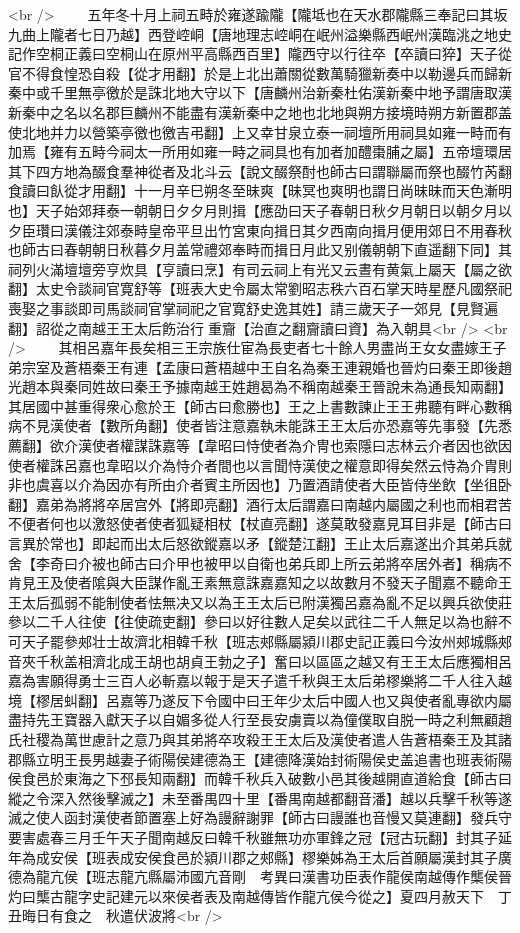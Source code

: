<br />
　　五年冬十月上祠五畤於雍遂踰隴【隴坻也在天水郡隴縣三奉記曰其坂九曲上隴者七日乃越】西登崆峒【唐地理志崆峒在岷州溢樂縣西岷州漢臨洮之地史記作空桐正義曰空桐山在原州平高縣西百里】隴西守以行往卒【卒讀曰猝】天子從官不得食惶恐自殺【從才用翻】於是上北出蕭關從數萬騎獵新奏中以勒邊兵而歸新秦中或千里無亭徼於是誅北地大守以下【唐麟州治新秦杜佑漢新秦中地予謂唐取漢新秦中之名以名郡巨麟州不能盡有漢新秦中之地也北地與朔方接境時朔方新置郡盖使北地并力以營築亭徼也徼吉弔翻】上又幸甘泉立泰一祠壇所用祠具如雍一畤而有加焉【雍有五畤今祠太一所用如雍一畤之祠具也有加者加醴棗脯之屬】五帝壇環居其下四方地為醊食羣神從者及北斗云【說文醊祭酎也師古曰謂聯屬而祭也醊竹芮翻食讀曰飤從才用翻】十一月辛巳朔冬至昧爽【昧冥也爽明也謂日尚昧昧而天色漸明也】天子始郊拜泰一朝朝日夕夕月則揖【應劭曰天子春朝日秋夕月朝日以朝夕月以夕臣瓚曰漢儀注郊泰畤皇帝平旦出竹宮東向揖日其夕西南向揖月便用郊日不用春秋也師古曰春朝朝日秋暮夕月盖常禮郊奉畤而揖日月此又别儀朝朝下直遥翻下同】其祠列火滿壇壇旁亨炊具【亨讀曰烹】有司云祠上有光又云晝有黄氣上屬天【屬之欲翻】太史令談祠官寛舒等【班表大史令屬太常劉昭志秩六百石掌天時星歷凡國祭祀喪娶之事談即司馬談祠官掌祠祀之官寛舒史逸其姓】請三歲天子一郊見【見賢遍翻】詔從之南越王王太后飭治行重齎【治直之翻齎讀曰資】為入朝具<br />
<br />
　　其相呂嘉年長矣相三王宗族仕宦為長吏者七十餘人男盡尚王女女盡嫁王子弟宗室及蒼梧秦王有連【孟康曰蒼梧越中王自名為秦王連親婚也晉灼曰秦王即後趙光趙本與秦同姓故曰秦王予據南越王姓趙曷為不稱南越秦王晉說未為通長知兩翻】其居國中甚重得衆心愈於王【師古曰愈勝也】王之上書數諫止王王弗聽有畔心數稱病不見漢使者【數所角翻】使者皆注意嘉執未能誅王王太后亦恐嘉等先事發【先悉薦翻】欲介漢使者權謀誅嘉等【韋昭曰恃使者為介冑也索隱曰志林云介者因也欲因使者權誅呂嘉也韋昭以介為恃介者間也以言聞恃漢使之權意即得矣然云恃為介胄則非也虞喜以介為因亦有所由介者賓主所因也】乃置酒請使者大臣皆侍坐飲【坐徂卧翻】嘉弟為將將卒居宫外【將即亮翻】酒行太后謂嘉曰南越内屬國之利也而相君苦不便者何也以激怒使者使者狐疑相杖【杖直亮翻】遂莫敢發嘉見耳目非是【師古曰言異於常也】即起而出太后怒欲鏦嘉以矛【鏦楚江翻】王止太后嘉遂出介其弟兵就舍【李奇曰介被也師古曰介甲也被甲以自衛也弟兵即上所云弟將卒居外者】稱病不肯見王及使者隂與大臣謀作亂王素無意誅嘉嘉知之以故數月不發天子聞嘉不聽命王王太后孤弱不能制使者怯無决又以為王王太后已附漢獨呂嘉為亂不足以興兵欲使莊參以二千人往使【往使疏吏翻】參曰以好往數人足矣以武往二千人無足以為也辭不可天子罷參郟壮士故濟北相韓千秋【班志郟縣屬潁川郡史記正義曰今汝州郟城縣郟音夾千秋盖相濟北成王胡也胡貞王勃之子】奮曰以區區之越又有王王太后應獨相呂嘉為害願得勇士三百人必斬嘉以報于是天子遣千秋與王太后弟樛樂將二千人往入越境【樛居虯翻】呂嘉等乃遂反下令國中曰王年少太后中國人也又與使者亂專欲内屬盡持先王寶器入獻天子以自媚多從人行至長安虜賣以為僮僕取自脱一時之利無顧趙氏社稷為萬世慮計之意乃與其弟將卒攻殺王王太后及漢使者遣人告蒼梧秦王及其諸郡縣立明王長男越妻子術陽侯建德為王【建德降漢始封術陽侯史盖追書也班表術陽侯食邑於東海之下邳長知兩翻】而韓千秋兵入破數小邑其後越開直道給食【師古曰縱之令深入然後擊滅之】未至番禺四十里【番禺南越都翻音潘】越以兵擊千秋等遂滅之使人函封漢使者節置塞上好為謾辭謝罪【師古曰謾誰也音慢又莫連翻】發兵守要害處春三月壬午天子聞南越反曰韓千秋雖無功亦軍鋒之冠【冠古玩翻】封其子延年為成安侯【班表成安侯食邑於潁川郡之郟縣】樛樂姊為王太后首願屬漢封其子廣德為龍亢侯【班志龍亢縣屬沛國亢音剛　考異曰漢書功臣表作龍侯南越傳作㰍侯晉灼曰㰍古龍字史記建元以來侯者表及南越傳皆作龍亢侯今從之】夏四月赦天下　丁丑晦日有食之　秋遣伏波將<br />

